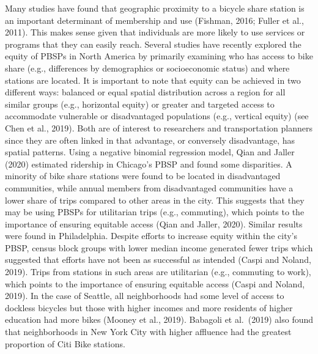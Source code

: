 \documentclass[]{elsarticle} %
\begin{document}
Many studies have found that geographic proximity to a bicycle share
station is an important determinant of membership and use (Fishman,
2016; Fuller et al., 2011). This makes sense given that individuals are
more likely to use services or programs that they can easily reach.
Several studies have recently explored the equity of PBSPs in North
America by primarily examining who has access to bike share (e.g.,
differences by demographics or socioeconomic status) and where stations
are located. It is important to note that equity can be achieved in two
different ways: balanced or equal spatial distribution across a region
for all similar groups (e.g., horizontal equity) or greater and targeted
access to accommodate vulnerable or disadvantaged populations (e.g.,
vertical equity) (see Chen et al., 2019). Both are of interest to
researchers and transportation planners since they are often linked in
that advantage, or conversely disadvantage, has spatial patterns. Using
a negative binomial regression model, Qian and Jaller (2020) estimated
ridership in Chicago's PBSP and found some disparities. A minority of
bike share stations were found to be located in disadvantaged
communities, while annual members from disadvantaged communities have a
lower share of trips compared to other areas in the city. This suggests
that they may be using PBSPs for utilitarian trips (e.g., commuting),
which points to the importance of ensuring equitable access (Qian and
Jaller, 2020). Similar results were found in Philadelphia. Despite
efforts to increase equity within the city's PBSP, census block groups
with lower median income generated fewer trips which suggested that
efforts have not been as successful as intended (Caspi and Noland,
2019). Trips from stations in such areas are utilitarian (e.g.,
commuting to work), which points to the importance of ensuring equitable
access (Caspi and Noland, 2019). In the case of Seattle, all
neighborhoods had some level of access to dockless bicycles but those
with higher incomes and more residents of higher education had more
bikes (Mooney et al., 2019). Babagoli et al.~(2019) also found that
neighborhoods in New York City with higher affluence had the greatest
proportion of Citi Bike stations.
\end{document}

